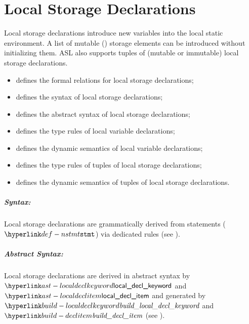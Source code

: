 \chapter{Local Storage Declarations\label{chap:LocalStorageDeclarations}}

Local storage declarations introduce new variables into the local static environment.
A list of mutable (\Tvar) storage elements can be introduced without initializing them.
ASL also supports tuples of (mutable or immutable) local storage declarations.


\ChapterOutline
\begin{itemize}
  \item {} defines the formal relations for local storage declarations;
  \item {} defines the syntax of local storage declarations;
  \item {} defines the abstract syntax of local storage declarations;
  \item {} defines the type rules of local variable declarations;
  \item {} defines the dynamic semantics of local variable declarations;
  \item {} defines the type rules of tuples of local storage declarations;
  \item {} defines the dynamic semantics of tuples of local storage declarations.
\end{itemize}

\paragraph{Syntax:} Local storage declarations are grammatically derived from statements ($\Nstmt$)
  via dedicated rules (see ).

\paragraph{Abstract Syntax:} Local storage declarations are derived in abstract syntax by\\
$\localdeclkeyword$ and $\localdeclitem$
and generated by $\buildlocaldeclkeyword$ and $\builddeclitem$
(see ).

